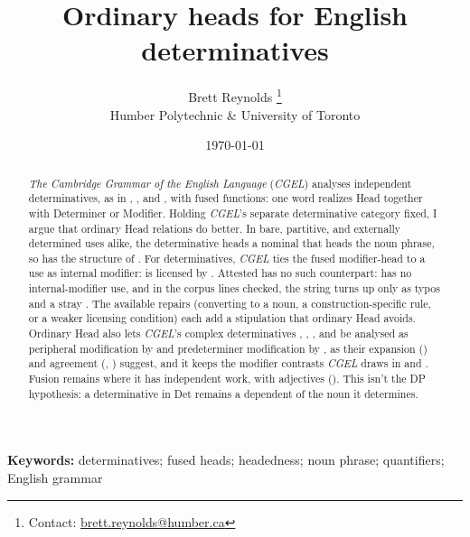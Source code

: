 \documentclass[12pt]{article}
\title{Ordinary heads for English determinatives}
\author{Brett Reynolds \orcidlink{0000-0003-0073-7195}%
\thanks{Contact: \href{mailto:brett.reynolds@humber.ca}{brett.reynolds@humber.ca}}\\
Humber Polytechnic \& University of Toronto}
\date{\today}
\begin{document}
\maketitle

\begin{abstract}
\textit{The Cambridge Grammar of the English Language} (\textit{CGEL}) analyses independent determinatives, as in , , and , with fused functions: one word realizes Head together with Determiner or Modifier. Holding \textit{CGEL}'s separate determinative category fixed, I argue that ordinary Head relations do better. In bare, partitive, and externally determined uses alike, the determinative heads a nominal that heads the noun phrase, so  has the structure of . For determinatives, \textit{CGEL} ties the fused modifier-head to a use as internal modifier:  is licensed by . Attested  has no such counterpart:  has no internal-modifier use, and in the corpus lines checked, the string  turns up only as typos and a stray .
The available repairs (converting  to a noun, a construction-specific rule, or a weaker licensing condition) each add a stipulation that ordinary Head avoids. Ordinary Head also lets \textit{CGEL}'s complex determinatives , , , and  be analysed as peripheral modification by  and predeterminer modification by , as their expansion () and agreement (, ) suggest, and it keeps the modifier contrasts \textit{CGEL} draws in  and . Fusion remains where it has independent work, with adjectives (). This isn't the DP hypothesis: a determinative in Det remains a dependent of the noun it determines.
\end{abstract}

\noindent\textbf{Keywords:} determinatives; fused heads; headedness; noun phrase; quantifiers; English grammar

\end{document}
